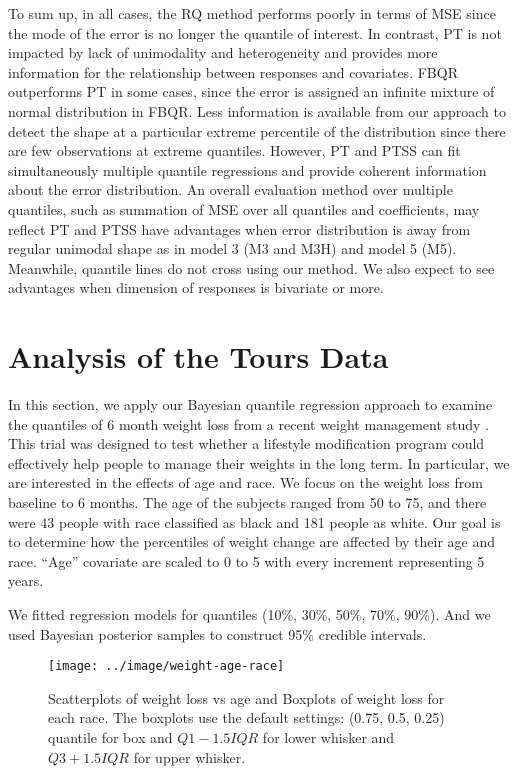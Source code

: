 \documentclass[12pt]{article}
\begin{document}
To sum up, in all cases, the RQ method performs poorly in terms of MSE
since the mode of the error is no longer the quantile of interest. In
contrast, PT is not impacted by lack of unimodality and heterogeneity
and provides more information for the relationship between responses
and covariates. FBQR outperforms PT in some cases, since the error is
assigned an infinite mixture of normal distribution in FBQR. Less
information is available from our approach to detect the shape at a
particular extreme percentile of the distribution since there are few
observations at extreme quantiles. However, PT and PTSS can fit
simultaneously multiple quantile regressions and provide coherent
information about the error distribution.  An overall evaluation
method over multiple quantiles, such as summation of MSE over all
quantiles and coefficients, may reflect PT and PTSS have advantages
when error distribution is away from regular unimodal shape as in
model 3 (M3 and M3H) and model 5 (M5).  Meanwhile, quantile lines do
not cross using our method.  We also expect to see advantages when
dimension of responses is bivariate or more.


\section{Analysis of the Tours Data}
\label{ch2:sec:tours}
In this section, we apply our Bayesian quantile regression approach to
examine the quantiles of 6 month weight loss from a recent weight
management study \citep{perri2008extended}.  This trial was designed
to test whether a lifestyle modification program could effectively
help people to manage their weights in the long term.  In particular,
we are interested in the effects of age and race.  We focus on the
weight loss from baseline to 6 months. The age of the subjects ranged
from 50 to 75, and there were 43 people with race classified as black
and 181 people as white.  Our goal is to determine how the percentiles
of weight change are affected by their age and race.  ``Age''
covariate are scaled to 0 to 5 with every increment representing 5
years.

We fitted regression models for quantiles (10\%, 30\%, 50\%, 70\%,
90\%). And we used Bayesian posterior samples to construct 95\%
credible intervals.

\begin{figure}[htbp]
  \centerline{\texttt{[image: ../image/weight-age-race]}}
  \caption[]{\label{ch2:fig:tours} Scatterplots of weight loss vs age and
    Boxplots of weight loss for each race.  The boxplots use the
    default settings: (0.75, 0.5, 0.25) quantile for box and
    $Q1-1.5IQR$ for lower whisker and $Q3+1.5IQR$ for upper whisker. }
\end{figure}
\end{document}

